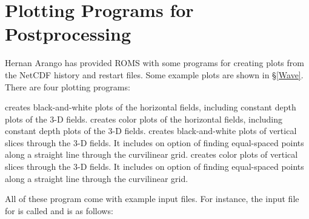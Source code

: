 \section{Plotting Programs for Postprocessing}
\label{Plothist}
Hernan Arango has provided ROMS with some programs for creating plots
from the NetCDF history and restart files. Some example plots are shown
in \S\ref{Wave}. There are four plotting programs:
\begin{klist}
    creates black-and-white plots of the horizontal fields,
including constant depth plots of the 3-D fields.
    creates color plots of the horizontal fields,
including constant depth plots of the 3-D fields.
    creates black-and-white plots of vertical slices through
the 3-D fields.  It includes on option of finding equal-spaced points
along a straight line through the curvilinear grid.
    creates color plots of vertical slices through
the 3-D fields.  It includes on option of finding equal-spaced points
along a straight line through the curvilinear grid.
\end{klist}
All of these program come with example input files.  For instance, the
input file for  is called  and is as follows:

